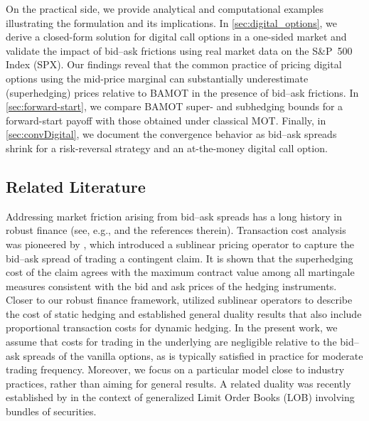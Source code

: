 \documentclass[11pt]{article}
\theoremstyle{plain}
\theoremstyle{definition}
\theoremstyle{remark}
\theoremstyle{plain}
\begin{document}
On the practical side, we provide analytical and computational examples illustrating the formulation and its implications. In \cref{sec:digital_options}, we derive a closed-form solution for digital call options in a one-sided market and validate the impact of bid--ask frictions using real market data on the S\&P~500 Index (SPX). Our findings reveal that the common practice of pricing digital options using the mid-price marginal can substantially underestimate (superhedging) prices relative to BAMOT in the presence of bid--ask frictions. In \cref{sec:forward-start}, we compare BAMOT super- and subhedging bounds for a forward-start payoff with those obtained under classical MOT. Finally, in \cref{sec:convDigital}, we document the convergence behavior as bid--ask spreads shrink for a risk-reversal strategy and an at-the-money digital call option.


%


%
%


\subsection{Related Literature}
Addressing market friction arising from bid--ask spreads has a long history in robust finance (see, e.g., \citep{BayraktarZhang2016, BouchardNutz2015, CheriditoKupperTangi2017, DupireBundle, JOUINIKALLAL} and the references therein). Transaction cost analysis was pioneered by \cite{JOUINIKALLAL}, which introduced a sublinear pricing operator %
to capture the bid--ask spread of trading a contingent claim. 
%
It is shown that the superhedging cost of the claim
%
agrees with the maximum contract value among all martingale measures consistent with the bid and ask prices of the hedging instruments. 
Closer to our robust finance framework, \cite{DolinskySoner2014} utilized sublinear operators to describe the cost of static hedging and established general duality results that also include proportional transaction costs for dynamic hedging. 
In the present work, we assume that costs for trading in the underlying are negligible relative to the bid--ask spreads of the vanilla options, as is typically satisfied in practice for moderate trading frequency. Moreover, we focus on a particular model close to industry practices, rather than aiming for general results.
%
%
%
%
%
%
A related duality was recently established by \cite{DupireBundle} in the context of generalized Limit Order Books (LOB) involving bundles of securities. 
%
%
\end{document}
